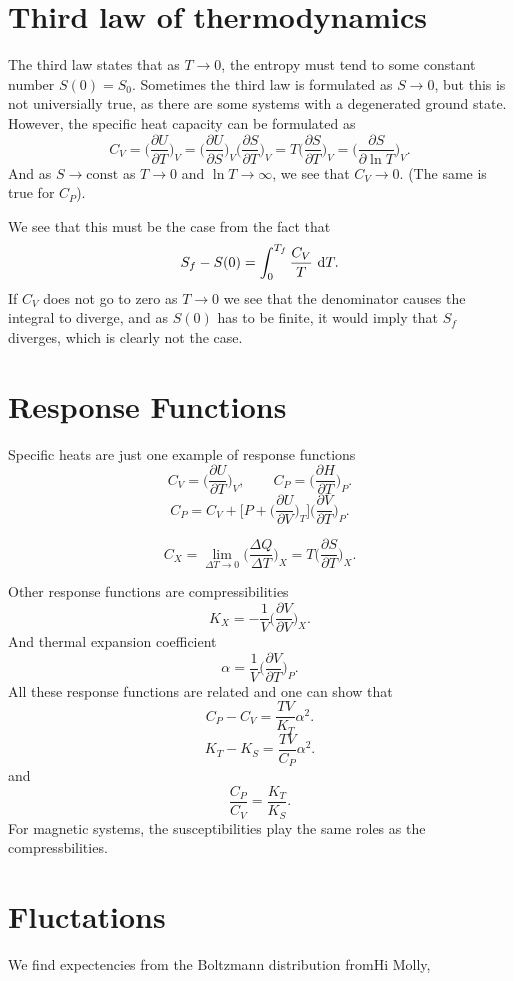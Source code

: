 \documentclass[a4paper, 11pt, notitlepage, english]{article}
\renewcommand{\d}{{\rm d}}
\newcommand{\p}{\partial}
\begin{document}
\section*{Third law of thermodynamics}
 
The third law states that as $T \to 0$, the entropy must tend to some constant number $S(0) = S_0$. Sometimes the third law is formulated as $S\to0$, but this is not universially true, as there are some systems with a degenerated ground state. However, the specific heat capacity can be formulated as
$$C_V = \bigg(\frac{\p U}{\p T}\bigg)_V = \bigg(\frac{\p U}{\p S}\bigg)_V\bigg(\frac{\p S}{\p T}\bigg)_V = T\bigg(\frac{\p S}{\p T}\bigg)_V = \bigg(\frac{\p S}{\p \ln T} \bigg)_V.$$
And as $S \to \mbox{const}$ as $T \to 0$ and $\ln T \to \infty$, we see that $C_V \to 0$. (The same is true for $C_P$).

We see that this must be the case from the fact that
$$S_f - S(0) = \int_0^{T_{f}} \frac{C_V}{T} \ \d T.$$
If $C_V$ does not go to zero as $T \to 0$ we see that the denominator causes the integral to diverge, and as $S(0)$ has to be finite, it would imply that $S_f$ diverges, which is clearly not the case.


\section*{Response Functions}

Specific heats are just one example of response functions
$$C_V = \bigg(\frac{\p U}{\p T}\bigg)_V, \qquad C_P = \bigg(\frac{\p H}{\p T}\bigg)_P.$$
$$C_P = C_V + \bigg[P + \bigg(\frac{\p U}{\p V}\bigg)_T\bigg]\bigg(\frac{\p V}{\p T}\bigg)_P.$$

$$C_X = \lim_{\Delta T \to 0} \bigg(\frac{\Delta Q}{\Delta T}\bigg)_X = T\bigg(\frac{\p S}{\p T}\bigg)_X.$$

Other response functions are compressibilities
$$K_X = -\frac{1}{V}\bigg(\frac{\p V}{\p V}\bigg)_X.$$
And thermal expansion coefficient
$$\alpha = \frac{1}{V}\bigg(\frac{\p V}{\p T}\bigg)_P.$$
All these response functions are related and one can show that
$$C_P - C_V = \frac{TV}{K_T}\alpha^2.$$
$$K_T - K_S = \frac{TV}{C_P}\alpha^2.$$
and
$$\frac{C_P}{C_V} = \frac{K_T}{K_S}.$$
For magnetic systems, the susceptibilities play the same roles as the compressbilities.


\section*{Fluctations}
We find expectencies from the Boltzmann distribution fromHi Molly,
\end{document}
